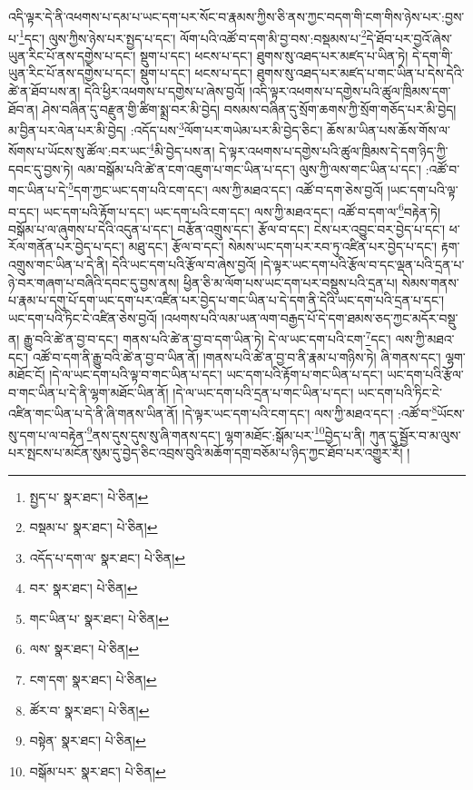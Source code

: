 འདི་ལྟར་དེ་ནི་འཕགས་པ་དམ་པ་ཡང་དག་པར་སོང་བ་རྣམས་ཀྱིས་ཅི་ནས་ཀྱང་བདག་གི་ངག་གིས་ཉེས་པར་:བྱས་པ་\footnote{སྤྱད་པ་  སྣར་ཐང་།  པེ་ཅིན། }དང་། ལུས་ཀྱིས་ཉེས་པར་སྤྱད་པ་དང་། ལོག་པའི་འཚོ་བ་དག་མི་བྱ་བས་:བསྡམས་པ་\footnote{བསྡམ་པ་  སྣར་ཐང་།  པེ་ཅིན། }དེ་ཐོབ་པར་བྱའོ་ཞེས་ཡུན་རིང་པོ་ནས་དགྱེས་པ་དང་། སྡུག་པ་དང་། ཕངས་པ་དང་། ཐུགས་སུ་འཐད་པར་མཛད་པ་ཡིན་ཏེ། དེ་དག་གི་ཡུན་རིང་པོ་ནས་དགྱེས་པ་དང་། སྡུག་པ་དང་། ཕངས་པ་དང་། ཐུགས་སུ་འཐད་པར་མཛད་པ་གང་ཡིན་པ་དེས་དེའི་ཚེ་ན་ཐོབ་པས་ན། དེའི་ཕྱིར་འཕགས་པ་དགྱེས་པ་ཞེས་བྱའོ། །འདི་ལྟར་འཕགས་པ་དགྱེས་པའི་ཚུལ་ཁྲིམས་དག་ཐོབ་ན། ཤེས་བཞིན་དུ་བརྫུན་གྱི་ཚིག་སྨྲ་བར་མི་བྱེད། བསམས་བཞིན་དུ་སྲོག་ཆགས་ཀྱི་སྲོག་གཅོད་པར་མི་བྱེད། མ་བྱིན་པར་ལེན་པར་མི་བྱེད། :འདོད་པས་\footnote{འདོད་པ་དག་ལ་  སྣར་ཐང་།  པེ་ཅིན། }ལོག་པར་གཡེམ་པར་མི་བྱེད་ཅིང་། ཆོས་མ་ཡིན་པས་ཆོས་གོས་ལ་སོགས་པ་ཡོངས་སུ་ཚོལ་:བར་ཡང་\footnote{བར་  སྣར་ཐང་།  པེ་ཅིན། }མི་བྱེད་པས་ན། དེ་ལྟར་འཕགས་པ་དགྱེས་པའི་ཚུལ་ཁྲིམས་དེ་དག་ཉིད་ཀྱི་དབང་དུ་བྱས་ཏེ། ལམ་བསྒོམ་པའི་ཚེ་ན་ངག་འཇུག་པ་གང་ཡིན་པ་དང་། ལུས་ཀྱི་ལས་གང་ཡིན་པ་དང་། :འཚོ་བ་གང་ཡིན་པ་དེ་\footnote{གང་ཡིན་པ་  སྣར་ཐང་།  པེ་ཅིན། }དག་ཀྱང་ཡང་དག་པའི་ངག་དང་། ལས་ཀྱི་མཐའ་དང་། འཚོ་བ་དག་ཅེས་བྱའོ། །ཡང་དག་པའི་ལྟ་བ་དང་། ཡང་དག་པའི་རྟོག་པ་དང་། ཡང་དག་པའི་ངག་དང་། ལས་ཀྱི་མཐའ་དང་། འཚོ་བ་དག་ལ་\footnote{ལས་  སྣར་ཐང་།  པེ་ཅིན། }བརྟེན་ཏེ། བསྒོམ་པ་ལ་ཞུགས་པ་དེའི་འདུན་པ་དང་། བརྩོན་འགྲུས་དང་། རྩོལ་བ་དང་། ངེས་པར་འབྱུང་བར་བྱེད་པ་དང་། ཕ་རོལ་གནོན་པར་བྱེད་པ་དང་། མཐུ་དང་། རྩོལ་བ་དང་། སེམས་ཡང་དག་པར་རབ་ཏུ་འཛིན་པར་བྱེད་པ་དང་། རྟག་འགྲུས་གང་ཡིན་པ་དེ་ནི། དེའི་ཡང་དག་པའི་རྩོལ་བ་ཞེས་བྱའོ། །དེ་ལྟར་ཡང་དག་པའི་རྩོལ་བ་དང་ལྡན་པའི་དྲན་པ་ཉེ་བར་གཞག་པ་བཞིའི་དབང་དུ་བྱས་ནས། ཕྱིན་ཅི་མ་ལོག་པས་ཡང་དག་པར་བསྡུས་པའི་དྲན་པ། སེམས་གནས་པ་རྣམ་པ་དགུ་པོ་དག་ཡང་དག་པར་འཛིན་པར་བྱེད་པ་གང་ཡིན་པ་དེ་དག་ནི་དེའི་ཡང་དག་པའི་དྲན་པ་དང་། ཡང་དག་པའི་ཏིང་ངེ་འཛིན་ཅེས་བྱའོ། །འཕགས་པའི་ལམ་ཡན་ལག་བརྒྱད་པོ་དེ་དག་ཐམས་ཅད་ཀྱང་མདོར་བསྡུ་ན། རྒྱུ་བའི་ཚེ་ན་བྱ་བ་དང་། གནས་པའི་ཚེ་ན་བྱ་བ་དག་ཡིན་ཏེ། དེ་ལ་ཡང་དག་པའི་ངག་\footnote{ངག་དག་  སྣར་ཐང་།  པེ་ཅིན། }དང་། ལས་ཀྱི་མཐའ་དང་། འཚོ་བ་དག་ནི་རྒྱུ་བའི་ཚེ་ན་བྱ་བ་ཡིན་ནོ། །གནས་པའི་ཚེ་ན་བྱ་བ་ནི་རྣམ་པ་གཉིས་ཏེ། ཞི་གནས་དང་། ལྷག་མཐོང་ངོ། །དེ་ལ་ཡང་དག་པའི་ལྟ་བ་གང་ཡིན་པ་དང་། ཡང་དག་པའི་རྟོག་པ་གང་ཡིན་པ་དང་། ཡང་དག་པའི་རྩོལ་བ་གང་ཡིན་པ་དེ་ནི་ལྷག་མཐོང་ཡིན་ནོ། །དེ་ལ་ཡང་དག་པའི་དྲན་པ་གང་ཡིན་པ་དང་། ཡང་དག་པའི་ཏིང་ངེ་འཛིན་གང་ཡིན་པ་དེ་ནི་ཞི་གནས་ཡིན་ནོ། །དེ་ལྟར་ཡང་དག་པའི་ངག་དང་། ལས་ཀྱི་མཐའ་དང་། :འཚོ་བ་\footnote{ཚོར་བ་  སྣར་ཐང་།  པེ་ཅིན། }ཡོངས་སུ་དག་པ་ལ་བརྟེན་\footnote{བསྟེན་  སྣར་ཐང་།  པེ་ཅིན། }ནས་དུས་དུས་སུ་ཞི་གནས་དང་། ལྷག་མཐོང་:སྒོམ་པར་\footnote{བསྒོམ་པར་  སྣར་ཐང་།  པེ་ཅིན། }བྱེད་པ་ནི། ཀུན་དུ་སྦྱོར་བ་མ་ལུས་པར་སྤངས་པ་མངོན་སུམ་དུ་བྱེད་ཅིང་འབྲས་བུའི་མཆོག་དགྲ་བཅོམ་པ་ཉིད་ཀྱང་ཐོབ་པར་འགྱུར་རོ། །
